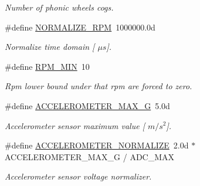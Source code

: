 \begin{DoxyCompactItemize}
\begin{DoxyCompactList}\small\item\em Number of phonic wheel\textquotesingle{}s cogs. \end{DoxyCompactList}\item 
\mbox{\label{group___board__model__group_ga579e1065b83e6aef14ce222295f8b7eb}} 
\#define \mbox{\hyperlink{group___board__model__group_ga579e1065b83e6aef14ce222295f8b7eb}{N\+O\+R\+M\+A\+L\+I\+Z\+E\+\_\+\+R\+PM}}~1000000.\+0d
\begin{DoxyCompactList}\small\item\em Normalize time domain \mbox{[} $\mu s$\mbox{]}. \end{DoxyCompactList}\item 
\mbox{\label{group___board__model__group_gafc05771487f188ffa40b6620afc1a9bc}} 
\#define \mbox{\hyperlink{group___board__model__group_gafc05771487f188ffa40b6620afc1a9bc}{R\+P\+M\+\_\+\+M\+IN}}~10
\begin{DoxyCompactList}\small\item\em Rpm lower bound under that rpm are forced to zero. \end{DoxyCompactList}\item 
\mbox{\label{group___board__model__group_gaa8634c7b040cfe3e016765395a38efa3}} 
\#define \mbox{\hyperlink{group___board__model__group_gaa8634c7b040cfe3e016765395a38efa3}{A\+C\+C\+E\+L\+E\+R\+O\+M\+E\+T\+E\+R\+\_\+\+M\+A\+X\+\_\+G}}~5.\+0d
\begin{DoxyCompactList}\small\item\em Accelerometer sensor maximum value \mbox{[} $m/s^{2}$\mbox{]}. \end{DoxyCompactList}\item 
\mbox{\label{group___board__model__group_ga5b18e6cd4163d6006ddf3c1f8a1e2a72}} 
\#define \mbox{\hyperlink{group___board__model__group_ga5b18e6cd4163d6006ddf3c1f8a1e2a72}{A\+C\+C\+E\+L\+E\+R\+O\+M\+E\+T\+E\+R\+\_\+\+N\+O\+R\+M\+A\+L\+I\+ZE}}~2.\+0d $\ast$ A\+C\+C\+E\+L\+E\+R\+O\+M\+E\+T\+E\+R\+\_\+\+M\+A\+X\+\_\+\+G / A\+D\+C\+\_\+\+M\+AX
\begin{DoxyCompactList}\small\item\em Accelerometer sensor voltage normalizer. \end{DoxyCompactList}\item 

\end{DoxyCompactItemize}
